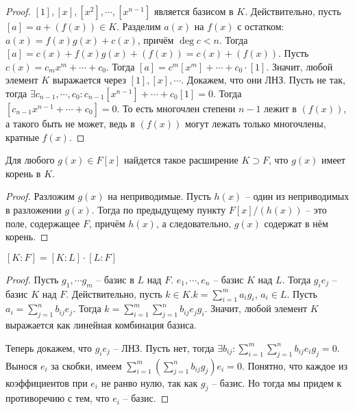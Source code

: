 \documentclass{article}
\begin{document}
\begin{proof}
    $[1], [x], [x^2], \cdots, [x^{n - 1}]$ является базисом в $K$. Действительно, пусть $[a] = a + (f(x)) \in K$.
    Разделим $a(x)$ на $f(x)$ с остатком: $a(x) = f(x)g(x) + c(x)$, причём $\deg c < n$. Тогда $[a] = c(x) + f(x)g(x) +
    (f(x)) = c(x) + (f(x))$. Пусть $c(x) = c_m x^m + \cdots + c_0$. Тогда $[a] = c^m [x^m] + \cdots + c_0 \cdot [1]$.
    Значит, любой элемент $K$ выражается через $[1], [x], \cdots$. Докажем, что они ЛНЗ. Пусть не так, тогда $\exists
    c_{n - 1}, \cdots, c_0: c_{n - 1}[x^{n - 1}] + \cdots + c_0 [1] = 0$. Тогда $[c_{n - 1} x^{n - 1} + \cdots + c_0] =
    0$. То есть многочлен степени $n - 1$ лежит в $(f(x))$, а такого быть не может, ведь в $(f(x))$ могут лежать только
    многочлены, кратные $f(x)$.
\end{proof}

\begin{statement}
    Для любого $g(x) \in F[x]$ найдется такое расширение $K \supset F$, что $g(x)$ имеет корень в $K$.
\end{statement}

\begin{proof}
    Разложим $g(x)$ на неприводимые. Пусть $h(x)$ -- один из неприводимых в разложении $g(x)$. Тогда по предыдущему
    пункту $F[x] / (h(x))$ -- это поле, содержащее $F$, причём $h(x)$, а следовательно, $g(x)$ содержат в нём корень.
\end{proof}

\begin{statement}
    $[K : F] = [K : L] \cdot [L : F]$
\end{statement}

\begin{proof}
Пусть $g_1, \cdots g_m$ -- базис в $L$ над $F$. $e_1, \cdots, e_n$ -- базис $K$ над $L$. Тогда $g_ie_j$ -- базис $K$ над
$F$. Действительно, пусть $k \in K. k = \sum_{i = 1}^m a_i g_i$, $a_i \in L$. Пусть $a_i = \sum_{j = 1}^n b_{ij}e_j$.
Тогда $k = \sum_{i = 1}^m \sum_{j = 1}^n b_{ij}e_j g_i$. Значит, любой элемент $K$ выражается как линейная комбинация
базиса.

Теперь докажем, что $g_ie_j$ -- ЛНЗ. Пусть нет, тогда $\exists b_{ij}: \sum_{i = 1}^m \sum_{j = 1}^n b_{ij} e_i g_j =
0$. Вынося $e_i$ за скобки, имеем $\sum_{i = 1}^m \left( \sum_{j =1 }^n b_{ij}g_j \right) e_i = 0$. Понятно, что каждое
из коэффициентов при $e_i$ не ранво нулю, так как $g_j$ -- базис. Но тогда мы придем к противоречию с тем, что $e_i$ --
базис.
\end{proof}
\end{document}
